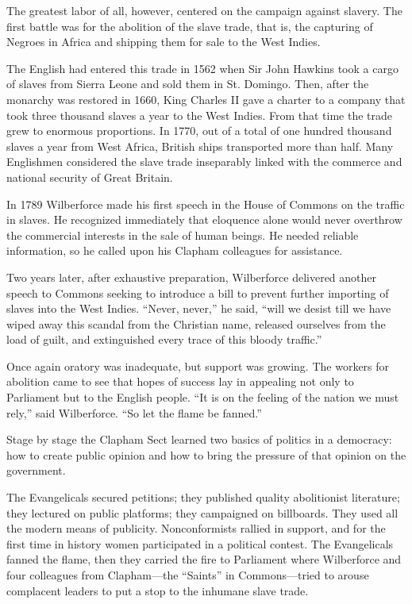 The greatest labor of all, however, centered on the campaign against slavery. The first battle was
for the abolition of the slave trade, that is, the capturing of Negroes in Africa and shipping them
for sale to the West Indies.

The English had entered this trade in 1562 when Sir John Hawkins took a cargo of slaves from Sierra
Leone and sold them in St. Domingo. Then, after the monarchy was restored in 1660, King Charles II
gave a charter to a company that took three thousand slaves a year to the West Indies. From that
time the trade grew to enormous proportions. In 1770, out of a total of one hundred thousand slaves
a year from West Africa, British ships transported more than half. Many Englishmen considered the
slave trade inseparably linked with the commerce and national security of Great Britain.

In 1789 Wilberforce made his first speech in the House of Commons on the traffic in slaves. He
recognized immediately that eloquence alone would never overthrow the commercial interests in the
sale of human beings. He needed reliable information, so he called upon his Clapham colleagues for
assistance.

Two years later, after exhaustive preparation, Wilberforce delivered another speech to Commons
seeking to introduce a bill to prevent further importing of slaves into the West Indies. “Never,
never,” he said, “will we desist till we have wiped away this scandal from the Christian name,
released ourselves from the load of guilt, and extinguished every trace of this bloody traffic.”

Once again oratory was inadequate, but support was growing. The workers for abolition came to see
that hopes of success lay in appealing not only to Parliament but to the English people. “It is on
the feeling of the nation we must rely,” said Wilberforce. “So let the flame be fanned.”

Stage by stage the Clapham Sect learned two basics of politics in a democracy: how to create public
opinion and how to bring the pressure of that opinion on the government.

The Evangelicals secured petitions; they published quality abolitionist literature; they lectured on
public platforms; they campaigned on billboards. They used all the modern means of publicity.
Nonconformists rallied in support, and for the first time in history women participated in a
political contest. The Evangelicals fanned the flame, then they carried the fire to Parliament where
Wilberforce and four colleagues from Clapham—the “Saints” in Commons—tried to arouse complacent
leaders to put a stop to the inhumane slave trade.

